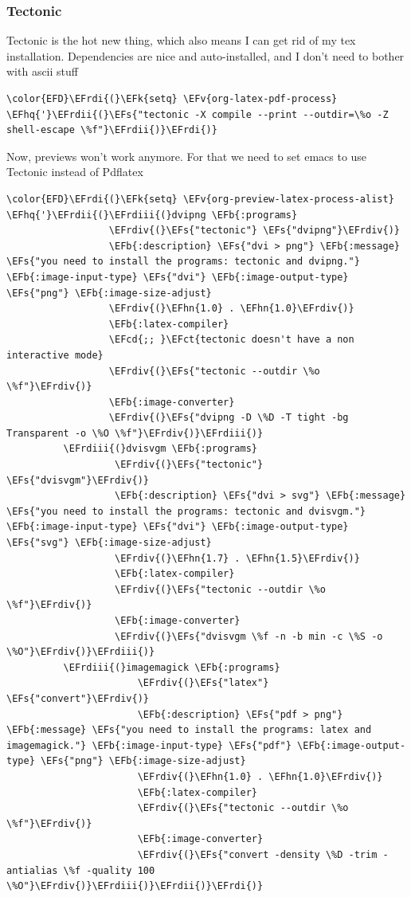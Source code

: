 \documentclass{scrartcl}
\newcommand{\EFk}[1]{\textcolor{EFk}{#1}} %
\newcommand{\EFs}[1]{\textcolor{EFs}{#1}} %
\newcommand{\EFb}[1]{\textcolor{EFb}{#1}} %
\newcommand{\EFct}[1]{\textcolor{EFct}{#1}} %
\newcommand{\EFv}[1]{\textcolor{EFv}{#1}} %
\newcommand{\EFcd}[1]{\textcolor{EFcd}{#1}} %
\newcommand{\EFhn}[1]{\textcolor{EFhn}{\textbf{#1}}} %
\newcommand{\EFhq}[1]{\textcolor{EFhq}{#1}} %
\newcommand{\EFrdi}[1]{\textcolor{EFrdi}{#1}} %
\newcommand{\EFrdii}[1]{\textcolor{EFrdii}{#1}} %
\newcommand{\EFrdiii}[1]{\textcolor{EFrdiii}{#1}} %
\newcommand{\EFrdiv}[1]{\textcolor{EFrdiv}{#1}} %
\begin{document}
\subsubsection{Tectonic}
\label{sec:orgb4d2ccf}
Tectonic is the hot new thing, which also means I can get rid of my tex
installation. Dependencies are nice and auto-installed, and I don't need to
bother with ascii stuff
\begin{Code}
\begin{Verbatim}[]
\color{EFD}\EFrdi{(}\EFk{setq} \EFv{org-latex-pdf-process} \EFhq{'}\EFrdii{(}\EFs{"tectonic -X compile --print --outdir=\%o -Z shell-escape \%f"}\EFrdii{)}\EFrdi{)}
\end{Verbatim}
\end{Code}

Now, previews won't work anymore. For that we need to set emacs to use Tectonic
instead of Pdflatex
\begin{Code}
\begin{Verbatim}[]
\color{EFD}\EFrdi{(}\EFk{setq} \EFv{org-preview-latex-process-alist}
\EFhq{'}\EFrdii{(}\EFrdiii{(}dvipng \EFb{:programs}
                  \EFrdiv{(}\EFs{"tectonic"} \EFs{"dvipng"}\EFrdiv{)}
                  \EFb{:description} \EFs{"dvi > png"} \EFb{:message} \EFs{"you need to install the programs: tectonic and dvipng."} \EFb{:image-input-type} \EFs{"dvi"} \EFb{:image-output-type} \EFs{"png"} \EFb{:image-size-adjust}
                  \EFrdiv{(}\EFhn{1.0} . \EFhn{1.0}\EFrdiv{)}
                  \EFb{:latex-compiler}
                  \EFcd{;; }\EFct{tectonic doesn't have a non interactive mode}
                  \EFrdiv{(}\EFs{"tectonic --outdir \%o \%f"}\EFrdiv{)}
                  \EFb{:image-converter}
                  \EFrdiv{(}\EFs{"dvipng -D \%D -T tight -bg Transparent -o \%O \%f"}\EFrdiv{)}\EFrdiii{)}
          \EFrdiii{(}dvisvgm \EFb{:programs}
                   \EFrdiv{(}\EFs{"tectonic"} \EFs{"dvisvgm"}\EFrdiv{)}
                   \EFb{:description} \EFs{"dvi > svg"} \EFb{:message} \EFs{"you need to install the programs: tectonic and dvisvgm."} \EFb{:image-input-type} \EFs{"dvi"} \EFb{:image-output-type} \EFs{"svg"} \EFb{:image-size-adjust}
                   \EFrdiv{(}\EFhn{1.7} . \EFhn{1.5}\EFrdiv{)}
                   \EFb{:latex-compiler}
                   \EFrdiv{(}\EFs{"tectonic --outdir \%o \%f"}\EFrdiv{)}
                   \EFb{:image-converter}
                   \EFrdiv{(}\EFs{"dvisvgm \%f -n -b min -c \%S -o \%O"}\EFrdiv{)}\EFrdiii{)}
          \EFrdiii{(}imagemagick \EFb{:programs}
                       \EFrdiv{(}\EFs{"latex"} \EFs{"convert"}\EFrdiv{)}
                       \EFb{:description} \EFs{"pdf > png"} \EFb{:message} \EFs{"you need to install the programs: latex and imagemagick."} \EFb{:image-input-type} \EFs{"pdf"} \EFb{:image-output-type} \EFs{"png"} \EFb{:image-size-adjust}
                       \EFrdiv{(}\EFhn{1.0} . \EFhn{1.0}\EFrdiv{)}
                       \EFb{:latex-compiler}
                       \EFrdiv{(}\EFs{"tectonic --outdir \%o \%f"}\EFrdiv{)}
                       \EFb{:image-converter}
                       \EFrdiv{(}\EFs{"convert -density \%D -trim -antialias \%f -quality 100 \%O"}\EFrdiv{)}\EFrdiii{)}\EFrdii{)}\EFrdi{)}
\end{Verbatim}
\end{Code}
\end{document}
